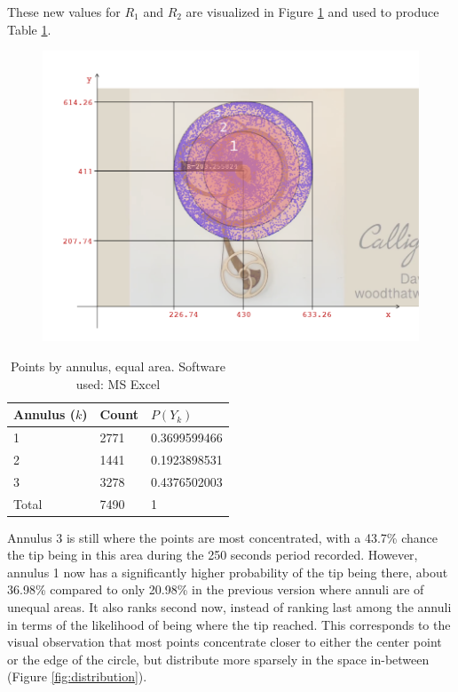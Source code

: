 \documentclass[a4paper,12pt]{article}
\begin{document}
These new values for $R_1$ and $R_2$ are visualized in Figure \ref{fig:ring2} and used to produce Table \ref{tab:ring2}.
\begin{figure}[H]
    \centering
    \includegraphics[width=\textwidth]{rings_equalArea}
    \caption{}
    \label{fig:ring2}
\end{figure}
    \begin{table}[H]
        \centering
        \begin{tabular}{|l|l|l|}
            \toprule
            Annulus ($k$)& Count & $P(Y_k)$\\
            \midrule
            1 & 2771 & 0.3699599466\\
            2 & 1441 & 0.1923898531\\
            3 & 3278 & 0.4376502003\\
            \midrule
            Total & 7490 & 1\\
            \bottomrule
        \end{tabular}
        \caption{\label{tab:ring2}Points by annulus, equal area. Software used: MS Excel}
    \end{table}
    Annulus 3 is still where the points are most concentrated, with a 43.7\% chance the tip being in this area during the 250 seconds period recorded. However, annulus 1 now has a significantly higher probability of the tip being there, about 36.98\% compared to only 20.98\% in the previous version where annuli are of unequal areas. It also ranks second now, instead of ranking last among the annuli in terms of the likelihood of being where the tip reached. This corresponds to the visual observation that most points concentrate closer to either the center point or the edge of the circle, but distribute more sparsely in the space in-between (Figure \ref{fig:distribution}).
\end{document}
